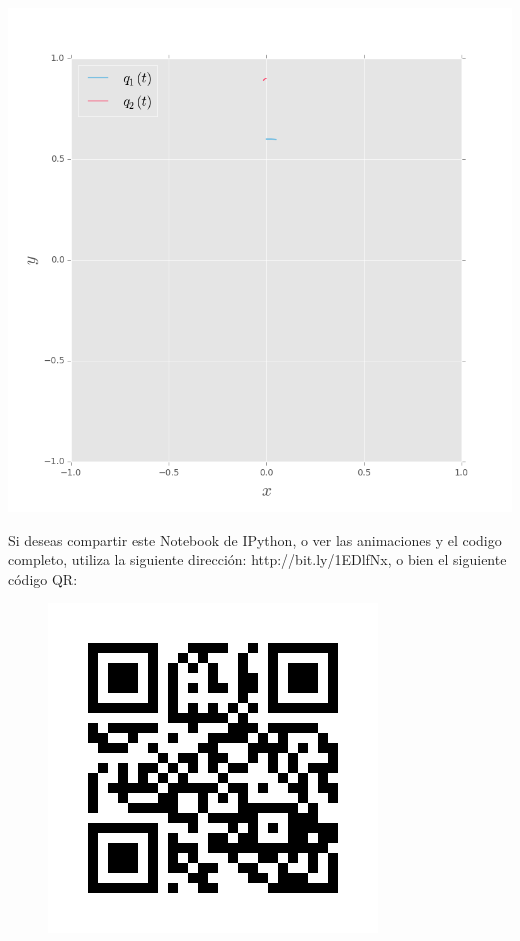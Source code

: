 \documentclass{article}
\begin{document}
\begin{center}
\includegraphics[width=0.5\linewidth]{./imagenes/xyacrobotoptimo.png}
\end{center}
        
    Si deseas compartir este Notebook de IPython, o ver las animaciones y el codigo completo, utiliza la siguiente
dirección: http://bit.ly/1EDlfNx, o bien el siguiente código QR:

\begin{figure}[htbp]
\centering
\includegraphics[width=0.2\linewidth]{codigos/acrobot.jpg}
\end{figure}


    
    
    
    
\end{document}
